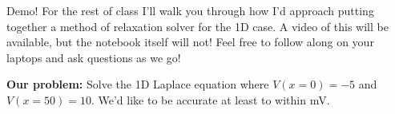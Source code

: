\documentclass[pdf,aspectratio=169]{beamer}
\begin{document}
\begin{frame}{Demo!}
	For the rest of class I'll walk you through how I'd approach putting together a method of relaxation solver for the 1D case. A video of this will be available, but the notebook itself will not! Feel free to follow along on your laptops and ask questions as we go!
	\vspace{1cm}

	\textbf{Our problem:} Solve the 1D Laplace equation where $V(x=0) = -5$ and $V(x=50)=10$. We'd like to be accurate at least to within \si{\milli\volt}.
\end{frame}
\end{document}
